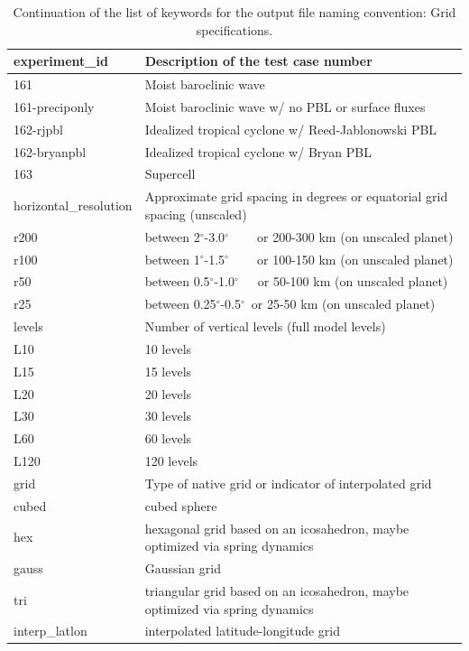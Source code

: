 \documentclass[times,doublespace]{fldauth}
\newcommand\T{\rule{0pt}{2.6ex}}
\newcommand\B{\rule[-1.2ex]{0pt}{0pt}}
\begin{document}
\begin{table}[h]
\caption{Continuation of the list of keywords for the output file naming convention: Grid specifications.} \label{tab:keywordsgrid}
\begin{tabular*}{\textwidth}{@{\extracolsep{\fill}}ll}
\hline 
experiment\_id \T \B & Description of the test case number \\  \hline 
161 \T& Moist baroclinic wave \\
161-preciponly \T& Moist baroclinic wave w/ no PBL or surface fluxes \\
162-rjpbl & Idealized tropical cyclone w/ Reed-Jablonowski PBL \\
162-bryanpbl & Idealized tropical cyclone w/ Bryan PBL \\
163 & Supercell \\ 
\hline horizontal\_resolution \T \B & Approximate grid spacing in degrees or equatorial grid spacing (unscaled)\\ \hline 
r200 \T & between 2$^\circ$-3.0$^\circ\quad\;\;\,\,$  or 200-300 km (on unscaled planet)\\
r100 & between 1$^\circ$-1.5$^\circ\quad\;\;\,\,$ or 100-150 km (on unscaled planet)\\
r50 & between 0.5$^\circ$-1.0$^\circ \quad\,$ or 50-100 km (on unscaled planet)\\
r25 \B& between 0.25$^\circ$-0.5$^\circ\,$ or 25-50 km (on unscaled planet)\\  \hline
levels \T \B & Number of vertical levels (full model levels)\\  \hline
L10  \T& 10 levels \\
L15 & 15 levels \\
L20 & 20 levels \\
L30 & 30 levels \\
L60 & 60 levels \\
L120 \B & 120 levels \\
\hline 
grid \T \B& Type of native grid or indicator of interpolated grid \\ \hline
cubed \T & cubed sphere \\
hex & hexagonal grid based on an icosahedron, maybe optimized via spring dynamics\\
gauss & Gaussian grid \\
tri & triangular grid based on an icosahedron, maybe optimized via spring dynamics\\
interp\_latlon & interpolated latitude-longitude grid \\

\end{tabular*}
\end{table}
\end{document}
